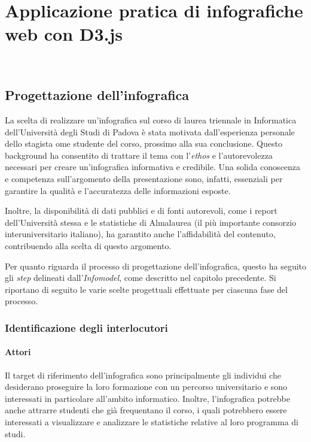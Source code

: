 \chapter{Applicazione pratica di infografiche web con D3.js}
\label{cap:applicazione}
\\

\section{Progettazione dell'infografica}
La scelta di realizzare un'infografica sul corso di laurea triennale in Informatica dell'Università degli Studi di Padova è stata motivata dall'esperienza personale dello stagista ome 
studente del corso, prossimo alla sua conclusione. 
Questo background ha consentito di trattare il tema con l'\emph{ethos} e l'autorevolezza necessari per creare un'infografica informativa e credibile.
Una solida conoscenza e competenza sull'argomento della presentazione sono, infatti, essenziali per garantire la qualità e l'accuratezza delle informazioni esposte.  

Inoltre, la disponibilità di dati pubblici e di fonti autorevoli, come i report dell'Università stessa e le statistiche di Almalaurea (il più importante consorzio interuniversitario italiano), ha 
garantito anche l'affidabilità del contenuto, contribuendo alla scelta di questo argomento.

\bigskip
\noindent Per quanto riguarda il processo di progettazione dell'infografica, questo ha seguito gli \emph{step} delineati dall'\emph{Infomodel}, come descritto nel capitolo precedente. 
Si riportano di seguito le varie scelte progettuali effettuate per ciascuna fase del processo.

\subsection{Identificazione degli interlocutori}
\subsubsection{Attori}
Il target di riferimento dell'infografica sono principalmente gli individui che desiderano proseguire la loro formazione con un percorso universitario e sono interessati
in particolare all'ambito informatico. 
Inoltre, l'infografica potrebbe anche attrarre studenti che già frequentano il corso, i quali potrebbero essere interessati a visualizzare e analizzare le statistiche relative al loro programma di studi. 


